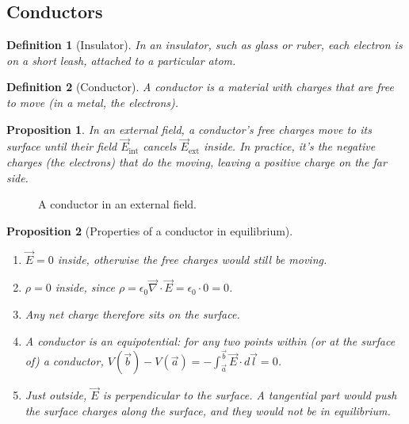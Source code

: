 \documentclass{article}
\newtheorem{definition}{Definition}
\newtheorem{proposition}{Proposition}
\begin{document}
\subsection{Conductors}
\begin{definition}[Insulator]
    In an insulator, such as glass or ruber, each electron is on a short leash, attached to a particular atom.
\end{definition}
\begin{definition}[Conductor]
    A conductor is a material with charges that are free to move (in a metal, the electrons). 
\end{definition}
\begin{proposition}
    In an external field, a conductor's free charges move to its surface until their field $\vec{E}_{\text{int}}$ cancels $\vec{E}_{\text{ext}}$ inside. In practice, it's the negative charges (the electrons) that do the moving, leaving a positive charge on the far side.
\end{proposition}
\begin{figure}[H]
    \centering
    \caption{A conductor in an external field.}
\end{figure}
\begin{proposition}[Properties of a conductor in equilibrium]\leavevmode
    \begin{enumerate}[label=(\roman*)]
        \item $\vec{E} = 0$ inside, otherwise the free charges would still be moving.
        \item $\rho = 0$ inside, since $\rho = \epsilon_0\vec{\nabla}\cdot\vec{E} = \epsilon_0 \cdot 0 = 0$.
        \item Any net charge therefore sits on the surface.
        \item A conductor is an equipotential: for any two points within (or at the surface of) a conductor, $V(\vec{b}) - V(\vec{a}) = -\int_{\vec{a}}^{\vec{b}}\vec{E}\cdot d\vec{l} = 0$.
        \item Just outside, $\vec{E}$ is perpendicular to the surface. A tangential part would push the surface charges along the surface, and they would not be in equilibrium.
    \end{enumerate}
\end{proposition}
\end{document}
